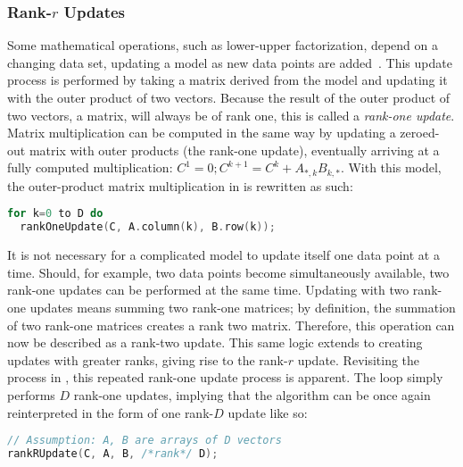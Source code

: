 \documentclass[\main/thesis.tex]{subfiles}
\begin{document}
\subsubsection{Rank-\texorpdfstring{$r$}{r} Updates}
Some mathematical operations, such as lower-upper factorization, depend on a changing data set, updating a model as new data points are added~\autocite{strange2007efficient}.
This update process is performed by taking a matrix derived from the model and updating it with the outer product of two vectors.
Because the result of the outer product of two vectors, a matrix, will always be of rank one, this is called a \emph{rank-one update}.\footnotemark
{}
Matrix multiplication can be computed in the same way by updating a zeroed-out matrix with outer products (the rank-one update), eventually arriving at a fully computed multiplication: $C^1=0; C^{k+1}=C^k+A_{*,k}B_{k,*}$.
With this model, the outer-product matrix multiplication in  is rewritten as such:
\begin{lstlisting}[caption={[Matrix Multiplication via Rank-One Update]Matrix multiplication using rank-one update.},label=lst:rankOne,language=C++,columns=flexible,morekeywords=uint64_t]
for k=0 to D do
  rankOneUpdate(C, A.column(k), B.row(k));
\end{lstlisting}

It is not necessary for a complicated model to update itself one data point at a time.
Should, for example, two data points become simultaneously available, two rank-one updates can be performed at the same time.
Updating with two rank-one updates means summing two rank-one matrices; by definition, the summation of two rank-one matrices creates a rank two matrix.\footnotemark
{}
Therefore, this operation can now be described as a rank-two update.
This same logic extends to creating updates with greater ranks, giving rise to the rank-$r$ update.\footnotemark
{}
Revisiting the process in , this repeated rank-one update process is apparent.
The loop simply performs $D$ rank-one updates, implying that the algorithm can be once again reinterpreted in the form of one rank-$D$ update like so:
\begin{lstlisting}[caption={[Matrix Multiplication Via Rank-\texorpdfstring{$r$}{r} Update]Matrix multiplication using rank-$r$ update.},label=lst:rankR,language=C++,columns=flexible,morekeywords=uint64_t]
// Assumption: A, B are arrays of D vectors
rankRUpdate(C, A, B, /*rank*/ D);
\end{lstlisting}
\end{document}
